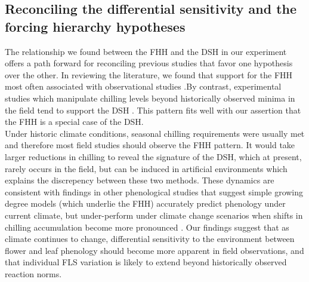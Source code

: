 \documentclass[11pt]{article}\usepackage[]{graphicx}\usepackage[]{color}
\begin{document}
\subsection*{Reconciling the differential sensitivity and the forcing hierarchy hypotheses}
\noindent The relationship we found between the FHH and the DSH in our experiment offers a path forward for reconciling previous studies that favor one hypothesis over the other. In reviewing the literature, we found that support for the FHH most often associated with observational studies \citep[e.g.][]{COSMULESCU:2020aa,Guo2014}.By contrast, experimental studies which manipulate chilling levels beyond historically observed minima in the field tend to support the DSH \citep[e.g.][]{Aslani2009,Gariglio2006}. This pattern fits well with our assertion that the FHH is a special case of the DSH.\\

\noindent Under historic climate conditions, seasonal chilling requirements were usually met \citep{Gauzere2019,Chuine:2016aa} and therefore most field studies should observe the FHH pattern. It would take larger reductions in chilling to reveal the signature of the DSH, which at present, rarely occurs in the field, but can be induced in artificial environments which explains the discrepency between these two methods. These dynamics are consistent with findings in other phenological studies that suggest simple growing degree models (which underlie the FHH) accurately predict phenology under current climate, but under-perform under climate change scenarios when shifts in chilling accumulation become more pronounced \citep{Linkosalo2008,Chuine:2016aa}. Our findings suggest that as climate continues to change, differential sensitivity to the environment between flower and leaf phenology should become more apparent in field observations, and that individual FLS variation is likely to extend beyond historically observed reaction norms.\\ 

\end{document}
